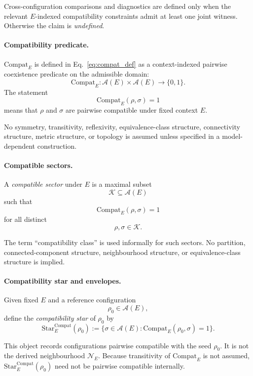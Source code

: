 \documentclass[aps,prx,onecolumn,11pt]{revtex4-2}
\theoremstyle{plain}
\theoremstyle{definition}
\theoremstyle{remark}
\begin{document}
Cross-configuration comparisons and diagnostics are defined only when
the relevant \(E\)-indexed compatibility constraints admit at least one
joint witness. Otherwise the claim is \emph{undefined}.

\paragraph{Compatibility predicate.}

\(\mathrm{Compat}_E\) is defined in Eq.~\eqref{eq:compat_def} as a
context-indexed pairwise coexistence predicate on the admissible domain:
\[
\mathrm{Compat}_E:
\mathcal A(E)\times\mathcal A(E)
\to
\{0,1\}.
\]
The statement
\[
\mathrm{Compat}_E(\rho,\sigma)=1
\]
means that \(\rho\) and \(\sigma\) are pairwise compatible under fixed
context \(E\).

No symmetry, transitivity, reflexivity, equivalence-class structure,
connectivity structure, metric structure, or topology is assumed unless
specified in a model-dependent construction.

\paragraph{Compatible sectors.}

A \emph{compatible sector} under \(E\) is a maximal subset
\[
\mathcal K
\subseteq
\mathcal A(E)
\]
such that
\[
\mathrm{Compat}_E(\rho,\sigma)=1
\]
for all distinct
\[
\rho,\sigma\in\mathcal K.
\]

The term ``compatibility class'' is used informally for such sectors.
No partition, connected-component structure, neighbourhood structure,
or equivalence-class structure is implied.

\paragraph{Compatibility star and envelopes.}

Given fixed \(E\) and a reference configuration
\[
\rho_0\in\mathcal A(E),
\]
define the \emph{compatibility star} of \(\rho_0\) by
\begin{equation}
\mathrm{Star}^{\mathrm{Compat}}_E(\rho_0)
:=
\{
\sigma\in\mathcal A(E):
\mathrm{Compat}_E(\rho_0,\sigma)=1
\}.
\label{eq:compat_star_def}
\end{equation}

This object records configurations pairwise compatible with the seed
\(\rho_0\). It is not the derived neighbourhood \(\mathcal N_E\).
Because transitivity of \(\mathrm{Compat}_E\) is not assumed,
\(\mathrm{Star}^{\mathrm{Compat}}_E(\rho_0)\) need not be pairwise
compatible internally.
\end{document}
